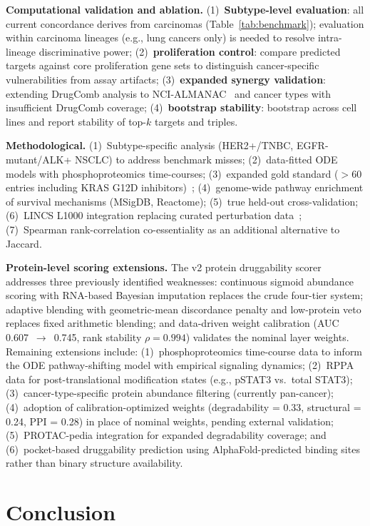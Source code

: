 \documentclass[times, twoside, watermark]{zHenriquesLab-StyleBioRxiv}
\begin{document}
\textbf{Computational validation and ablation.} (1)~\textbf{Subtype-level evaluation}: all current concordance derives from carcinomas (Table~\ref{tab:benchmark}); evaluation within carcinoma lineages (e.g., lung cancers only) is needed to resolve intra-lineage discriminative power; (2)~\textbf{proliferation control}: compare predicted targets against core proliferation gene sets to distinguish cancer-specific vulnerabilities from assay artifacts; (3)~\textbf{expanded synergy validation}: extending DrugComb analysis to NCI-ALMANAC~\cite{Holbeck2017} and cancer types with insufficient DrugComb coverage; (4)~\textbf{bootstrap stability}: bootstrap across cell lines and report stability of top-$k$ targets and triples.

\textbf{Methodological.} (1)~Subtype-specific analysis (HER2+/TNBC, EGFR-mutant/ALK+ NSCLC) to address benchmark misses; (2)~data-fitted ODE models with phosphoproteomics time-courses; (3)~expanded gold standard ($>$60 entries including KRAS G12D inhibitors)~\cite{Menden2019,Holbeck2017}; (4)~genome-wide pathway enrichment of survival mechanisms (MSigDB, Reactome); (5)~true held-out cross-validation; (6)~LINCS L1000 integration replacing curated perturbation data~\cite{Subramanian2017}; (7)~Spearman rank-correlation co-essentiality as an additional alternative to Jaccard.

\textbf{Protein-level scoring extensions.} The v2 protein druggability scorer addresses three previously identified weaknesses: continuous sigmoid abundance scoring with RNA-based Bayesian imputation replaces the crude four-tier system; adaptive blending with geometric-mean discordance penalty and low-protein veto replaces fixed arithmetic blending; and data-driven weight calibration (AUC 0.607~$\to$~0.745, rank stability $\rho = 0.994$) validates the nominal layer weights. Remaining extensions include: (1)~phosphoproteomics time-course data to inform the ODE pathway-shifting model with empirical signaling dynamics; (2)~RPPA data for post-translational modification states (e.g., pSTAT3 vs.\ total STAT3); (3)~cancer-type-specific protein abundance filtering (currently pan-cancer); (4)~adoption of calibration-optimized weights (degradability = 0.33, structural = 0.24, PPI = 0.28) in place of nominal weights, pending external validation; (5)~PROTAC-pedia integration for expanded degradability coverage; and (6)~pocket-based druggability prediction using AlphaFold-predicted binding sites rather than binary structure availability.

\section*{Conclusion}
\end{document}

